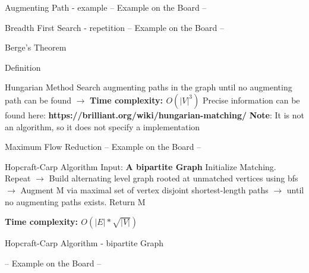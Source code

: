 \begin{frame}{Augmenting Path - example}
-- Example on the Board --
  
\end{frame}

\begin{frame}{Breadth First Search - repetition}
-- Example on the Board --
  
\end{frame}

\begin{frame}{Berge's Theorem}
\begin{block}{Definition}
\end{block} 
  
\end{frame}

\begin{frame}{Hungarian Method}
Search augmenting paths in the graph until no augmenting path can be found\newline
\newline
$\rightarrow$ \textbf {Time complexity: $O(|V|^3)$}\newline
\newline
Precise information can be found here: \textbf {https://brilliant.org/wiki/hungarian-matching/}\newline
\newline
\textbf {Note}: It is not an algorithm, so it does not specify a implementation
\end{frame}

\begin{frame}{Maximum Flow Reduction}
-- Example on the Board --
  
\end{frame}

\begin{frame}{Hopcraft-Carp Algorithm}
Input: \textbf{A bipartite Graph}
Initialize Matching. Repeat\newline
$\rightarrow$ Build alternating level graph rooted at unmatched vertices using bfs\newline
$\rightarrow$ Augment M via maximal set of vertex disjoint shortest-length paths\newline
$\rightarrow$ until no augmenting paths exists. Return M\newline
		
\textbf {Time complexity: $O(|E|*\sqrt{|V|})$}
  
\end{frame}

\begin{frame}{Hopcraft-Carp Algorithm - bipartite Graph}

-- Example on the Board --
  
\end{frame}
